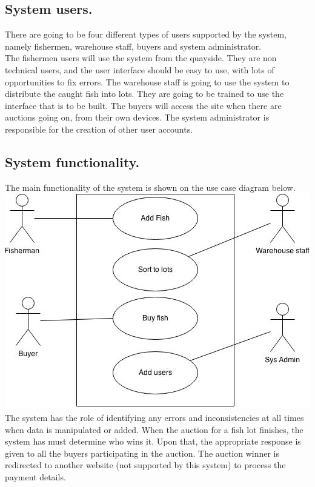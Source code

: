 \documentclass[a4paper]{article}
\begin{document}
\subsection{System users.}
There are going to be four different types of users supported by the system, namely fishermen, warehouse staff, buyers and system administrator.\\

The fishermen users will use the system from the quayside. They are non technical users, and the user interface should be easy to use, with lots of opportunities to fix errors. 
The warehouse staff is going to use the system to distribute the caught fish into lots. They are going to be trained to use the interface that is to be built. The buyers will access the site when there are auctions going on, from their own devices. The system administrator is responsible for the creation of other user accounts.
\\
\subsection{System functionality.}
The main functionality of the system is shown on the use case diagram below. \\
\includegraphics[scale=0.5]{cs223.jpg} \\
The system has the role of identifying any errors and inconsistencies at all times when data is manipulated or added. When the auction for a fish lot finishes, the system has must determine who wins it. Upon that, the appropriate response is given to all the buyers participating in the auction. The auction winner is redirected to another website (not supported by this system) to process the payment details.
\end{document}
